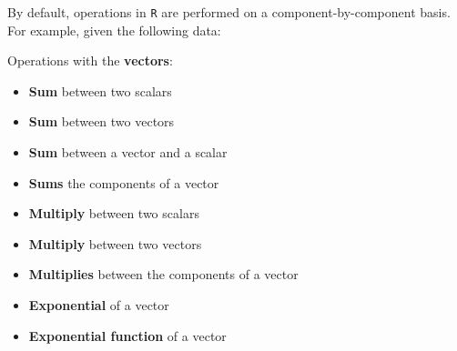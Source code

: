 \documentclass[a4paper]{article}
\begin{document}
    By default, operations in \texttt{R} are performed on a component-by-component basis. For example, given the following data:
    
    Operations with the \textbf{vectors}:
    \begin{itemize}
        \item \textbf{Sum} between two scalars
        

        \item \textbf{Sum} between two vectors
        

        \item \textbf{Sum} between a vector and a scalar
        

        \item \textbf{Sums} the components of a vector
        

        \item \textbf{Multiply} between two scalars
        

        \item \textbf{Multiply} between two vectors
        

        \item \textbf{Multiplies} between the components of a vector
        

        \item \textbf{Exponential} of a vector
        

        \item \textbf{Exponential function} of a vector
        
    \end{itemize}

    \newpage
\end{document}
